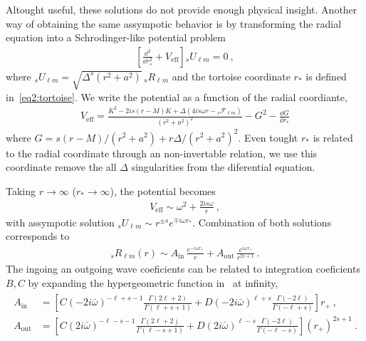 Altought useful, these solutions do not provide enough physical insight. Another way of obtaining the same assympotic behavior is by transforming the radial equation into a Schrodinger-like potential problem
\begin{align}
    \left[ \frac{\dd^2}{\dd r_{*}^2} + V_\mathrm{eff} \right] {}_{s}U_{\ell m} = 0 ~,
\end{align}
where ${}_{s}U_{\ell m}=\sqrt{\Delta^s (r^2 + a^2)} \,{}_{s}R_{\ell m}$ and the tortoise coordinate $r_*$ is defined in~\eqref{eq2:tortoise}.
We write the potential as a function of the radial coordiante,
\begin{align}
    V_\mathrm{eff} = \frac{K^2 - 2 i s (r-M) K + \Delta ( 4 i s \omega r - {}_{s}\mathscr{F}_{\ell m} )}{(r^2+a^2)^2} - G^2 - \frac{\dd G}{\dd r_{*}}
\end{align}
where $G = s(r-M)/(r^2+a^2)+ r \Delta/(r^2+a^2)^2$.
Even tought $r_*$ is related to the radial coordinate through an non-invertable relation, we use this coordinate remove the all $\Delta$ singularities from the diferential equation. 

Taking $r\to\infty$ ($r_{*}\to\infty$), the potential becomes
\begin{align}
    V_\mathrm{eff} \sim \omega^2 + \frac{2 i s \omega}{r} ~,
\end{align}
with assympotic solution ${}_{s}U_{\ell m}\sim r^{\pm s} e^{\mp i \omega r_{*}}$.
Combination of both solutions corresponds to
\begin{align}
    {}_{s}R_{\ell m}(r) \sim A_\mathrm{in}\, \frac{e^{-i \omega r_*}}{r} + A_\mathrm{out}\, \frac{e^{i \omega r_*}}{r^{2s+1}} ~.
    \label{eq3:asymptoticR}
\end{align}
The ingoing an outgoing wave coeficients can be related to integration coeficients $B,C$ by expanding the hypergeometric function in~ at infinity,
\begin{align}
    \begin{split}
    A_\mathrm{in} &= \left[ C (-2 i \bar{\omega})^{-\ell+s-1} \frac{\Gamma(2\ell+2)}{\Gamma(\ell+s+1)} + D (-2 i \bar{\omega})^{\ell+s} \frac{\Gamma(-2\ell)}{\Gamma(-\ell+s)} \right] r_{+} ~, \\
    A_\mathrm{out} &= \left[ C (2 i \bar{\omega})^{-\ell-s-1} \frac{\Gamma(2\ell+2)}{\Gamma(\ell-s+1)} + D (2 i \bar{\omega})^{\ell-s} \frac{\Gamma(-2\ell)}{\Gamma(-\ell-s)} \right] (r_{+})^{2s+1}  ~.
    \end{split}
\end{align}

